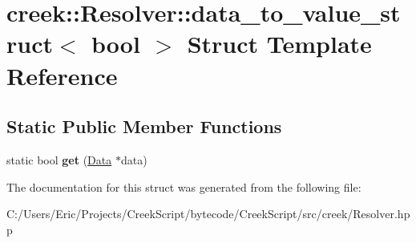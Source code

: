 \hypertarget{structcreek_1_1_resolver_1_1data__to__value__struct_3_01bool_01_4}{}\section{creek\+:\+:Resolver\+:\+:data\+\_\+to\+\_\+value\+\_\+struct$<$ bool $>$ Struct Template Reference}
\label{structcreek_1_1_resolver_1_1data__to__value__struct_3_01bool_01_4}
\subsection*{Static Public Member Functions}
\begin{DoxyCompactItemize}
\item 
static bool {\bfseries get} (\hyperlink{classcreek_1_1_data}{Data} $\ast$data)\hypertarget{structcreek_1_1_resolver_1_1data__to__value__struct_3_01bool_01_4_a7c8b6650376aaf541c44fa171face9a7}{}\label{structcreek_1_1_resolver_1_1data__to__value__struct_3_01bool_01_4_a7c8b6650376aaf541c44fa171face9a7}

\end{DoxyCompactItemize}


The documentation for this struct was generated from the following file\+:\begin{DoxyCompactItemize}
\item 
C\+:/\+Users/\+Eric/\+Projects/\+Creek\+Script/bytecode/\+Creek\+Script/src/creek/Resolver.\+hpp\end{DoxyCompactItemize}
